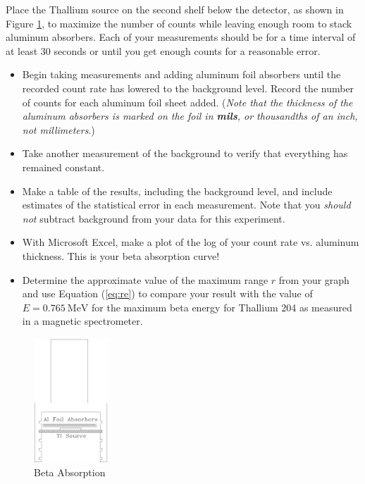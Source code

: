 Place the Thallium source on the second shelf below the detector, as shown in Figure {\ref{fig:absorption}}, to maximize the number of counts while leaving enough room to stack aluminum absorbers. Each of your measurements should be for a time interval of at least 30 seconds or until you get enough counts for a reasonable error.
\begin{itemize}
  \item Begin taking measurements and adding aluminum foil absorbers until the recorded count rate has lowered to the background level. Record the number of counts for each aluminum foil sheet added. (\emph{Note that the thickness of the aluminum absorbers is marked on the foil in \textbf{mils}, or thousandths of an inch, not millimeters}.)
  \item Take another measurement of the background to verify that everything has remained constant.
  \item Make a table of the results, including the background level, and include estimates of the statistical error in each measurement. Note that you \emph{should not} subtract background from your data for this experiment.
  \item With Microsoft Excel, make a plot of the log of your count rate vs. aluminum thickness. This is your beta absorption curve!
  \item Determine the approximate value of the maximum range $r$ from your graph and use Equation ({\ref{eq:re}}) to compare your result with the value of $E = 0.765\ \mathrm{MeV}$ for the maximum beta energy for Thallium 204 as measured in a magnetic spectrometer.
\end{itemize}

\begin{figure}[h]
\centering
\includegraphics[width=0.25\textwidth]{./Exp10/pic/image8.png}
\caption{Beta Absorption}
\label{fig:absorption}
\end{figure}

